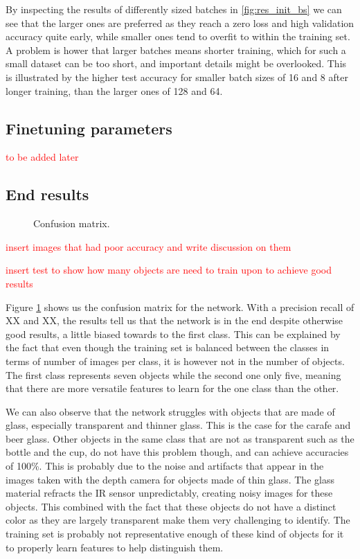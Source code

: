 By inspecting the results of differently sized batches in \ref{fig:res_init_bs} we can see that the larger ones are preferred as they reach a zero loss and high validation accuracy quite early, while smaller ones tend to overfit to within the training set. A problem is hower that larger batches means shorter training, which for such a small dataset can be too short, and important details might be overlooked. This is illustrated by the higher test accuracy for smaller batch sizes of 16 and 8 after longer training, than the larger ones of 128 and 64.


\subsection{Finetuning parameters}

\textcolor{red}{to be added later}

\subsection{End results}

\begin{figure}
	
	\caption{Confusion matrix.}
	\label{fig:confusion_matrix}
\end{figure}

\textcolor{red}{insert images that had poor accuracy and write discussion on them}

\textcolor{red}{insert test to show how many objects are need to train upon to achieve good results}

Figure \ref{fig:confusion_matrix} shows us the confusion matrix for the network. With a precision recall of XX and XX, the results tell us that the network is in the end despite otherwise good results, a little biased towards to the first class. This can be explained by the fact that even though the training set is balanced between the classes in terms of number of images per class, it is however not in the number of objects. The first class represents seven objects while the second one only five, meaning that there are more versatile features to learn for the one class than the other.

We can also observe that the network struggles with objects that are made of glass, especially transparent and thinner glass. This is the case for the carafe and beer glass. Other objects in the same class that are not as transparent such as the bottle and the cup, do not have this problem though, and can achieve accuracies of 100\%. This is probably due to the noise and artifacts that appear in the images taken with the depth camera for objects made of thin glass. The glass material refracts the IR sensor unpredictably, creating noisy images for these objects. This combined with the fact that these objects do not have a distinct color as they are largely transparent make them very challenging to identify. The training set is probably not representative enough of these kind of objects for it to properly learn features to help distinguish them.


